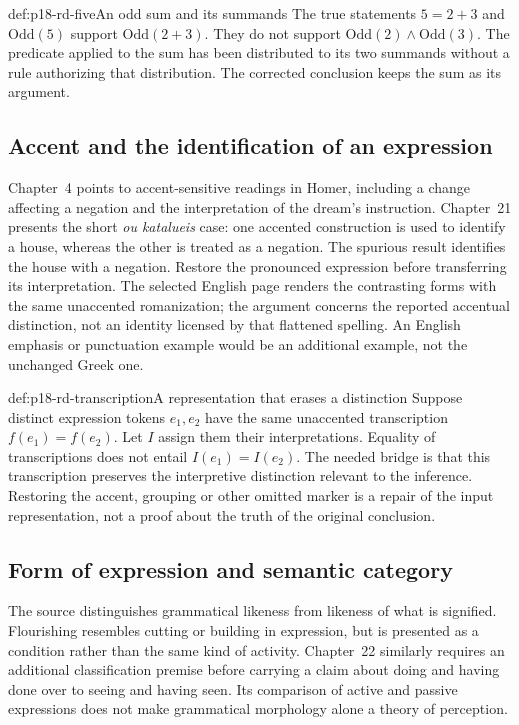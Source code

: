\begin{hbexample}{def:p18-rd-five}{An odd sum and its summands}
The true statements \(5=2+3\) and \(\mathrm{Odd}(5)\) support
\(\mathrm{Odd}(2+3)\). They do not support
\(\mathrm{Odd}(2)\land\mathrm{Odd}(3)\). The predicate applied
to the sum has been distributed to its two summands without a rule
authorizing that distribution. The corrected conclusion keeps the
sum as its argument.
\end{hbexample}

\subsection{Accent and the identification of an expression}

Chapter~4 points to accent-sensitive readings in Homer, including a
change affecting a negation and the interpretation of the dream's
instruction. Chapter~21 presents the short \emph{ou katalueis} case:
one accented construction is used to identify a house, whereas the
other is treated as a negation. The spurious result identifies the
house with a negation. Restore the pronounced expression before
transferring its interpretation. The selected English page renders
the contrasting forms with the same unaccented romanization; the
argument concerns the reported accentual distinction, not an identity
licensed by that flattened spelling. An English emphasis or punctuation
example would be an additional example, not the unchanged Greek one.

\begin{hbexample}{def:p18-rd-transcription}{A representation that erases a distinction}
Suppose distinct expression tokens \(e_1,e_2\) have the same
unaccented transcription \(f(e_1)=f(e_2)\). Let \(I\) assign
them their interpretations. Equality of transcriptions does not entail
\(I(e_1)=I(e_2)\). The needed bridge is that this transcription
preserves the interpretive distinction relevant to the inference.
Restoring the accent, grouping or other omitted marker is a repair
of the input representation, not a proof about the truth of the
original conclusion.
\end{hbexample}

\subsection{Form of expression and semantic category}

The source distinguishes grammatical likeness from likeness of what
is signified. Flourishing resembles cutting or building in expression,
but is presented as a condition rather than the same kind of activity.
Chapter~22 similarly requires an additional classification premise
before carrying a claim about doing and having done over to seeing
and having seen. Its comparison of active and passive expressions
does not make grammatical morphology alone a theory of perception.

